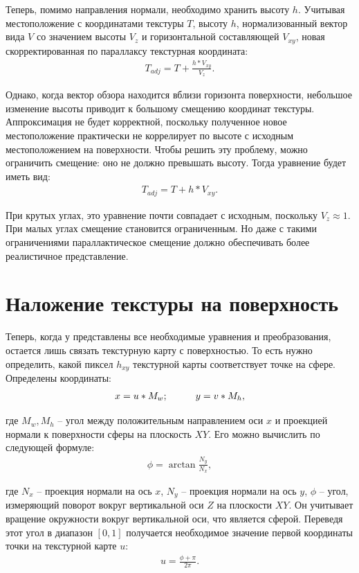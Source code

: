 Теперь, помимо направления нормали, необходимо хранить высоту $h$. Учитывая местоположение с координатами текстуры $T$, высоту $h$, нормализованный вектор вида $V$ со значением высоты $V_{z}$ и горизонтальной составляющей $V_{xy}$, новая скорректированная по параллаксу текстурная координата:
\begin{gather}
	T_{adj} = T + \frac{h*V_{xy}}{V_{z}}.
\end{gather}

Однако, когда вектор обзора находится вблизи горизонта поверхности, небольшое изменение высоты приводит к большому смещению координат текстуры. Аппроксимация не будет корректной, поскольку полученное новое местоположение практически не коррелирует по высоте с исходным местоположением на поверхности. Чтобы решить эту проблему, можно ограничить смещение: оно не должно превышать высоту. Тогда уравнение будет иметь вид:
\begin{gather}
	T_{adj} = T + h*V_{xy}.
\end{gather}

При крутых углах, это уравнение почти совпадает с исходным, поскольку $V_{z} \approx 1$. При малых углах смещение становится ограниченным. Но даже с такими ограничениями параллактическое смещение должно обеспечивать более реалистичное представление.

\section{Наложение текстуры на поверхность}

Теперь, когда у представлены все необходимые уравнения и преобразования, остается лишь связать текстурную карту с поверхностью. То есть нужно определить, какой пиксел $h_{xy}$ текстурной карты соответствует точке на сфере. Определены координаты:
\begin{gather}
	x=u*M_w; \hspace*{1cm} y=v*M_h,
\end{gather}

где $M_w, M_h$ -- угол между положительным направлением оси $x$ и проекцией нормали к поверхности сферы на плоскость $XY$. Его можно вычислить по следующей формуле:
\begin{gather}
	\phi=\arctan{\frac{N_y}{N_x}},
\end{gather}

где $N_x$ -- проекция нормали на ось $x$, $N_y$ -- проекция нормали на ось $y$, $\phi$ -- угол, измеряющий поворот вокруг вертикальной оси $Z$ на плоскости $XY$. Он учитывает вращение окружности вокруг вертикальной оси, что является сферой. Переведя этот угол в диапазон $[0, 1]$ получается необходимое значение первой координаты точки на текстурной карте $u$:
\begin{gather}
	u=\frac{\phi+\pi}{2\pi}.
\end{gather}

